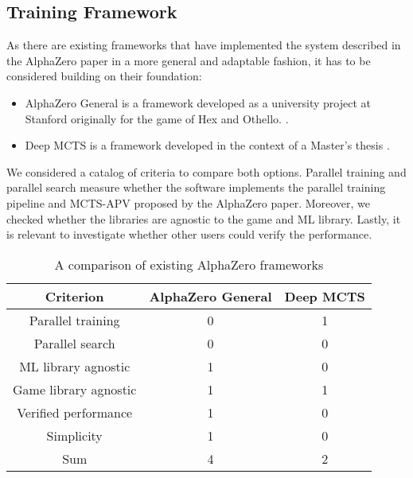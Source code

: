 \subsection{Training Framework}
\label{training_framework}
As there are existing frameworks that have implemented the system described in the AlphaZero paper in a more general and adaptable fashion, it has to be considered building on their foundation:
\begin{itemize}
    \item AlphaZero General is a framework developed as a university project at Stanford originally for the game of Hex and Othello. \cite{thakoor_learning_nodate,thakoor_suragnairalpha-zero-general_nodate}.
    \item Deep MCTS is a framework developed in the context of a Master's thesis \cite{bruasdal_deep_2020,henribru_deep_2021}.
\end{itemize}

We considered a catalog of criteria to compare both options. Parallel training and parallel search measure whether the software implements the parallel training pipeline and MCTS-APV proposed by the AlphaZero paper. Moreover, we checked whether the libraries are agnostic to the game and ML library. Lastly, it is relevant to investigate whether other users could verify the performance.

\begin{table*}
    \begin{center}
        \begin{tabular}{ c|c|c }
            Criterion             & AlphaZero General & Deep MCTS \\
            \hline
            \hline
            Parallel training     & 0                 & 1         \\
            Parallel search       & 0                 & 0         \\
            ML library agnostic   & 1                 & 0         \\
            Game library agnostic & 1                 & 1         \\
            Verified performance  & 1                 & 0         \\
            Simplicity            & 1                 & 0         \\
            \hline
            \hline
            Sum                   & 4                 & 2         \\
        \end{tabular}
    \end{center}
    \caption{A comparison of existing AlphaZero frameworks}\label{training_framework_comparison}
\end{table*}

